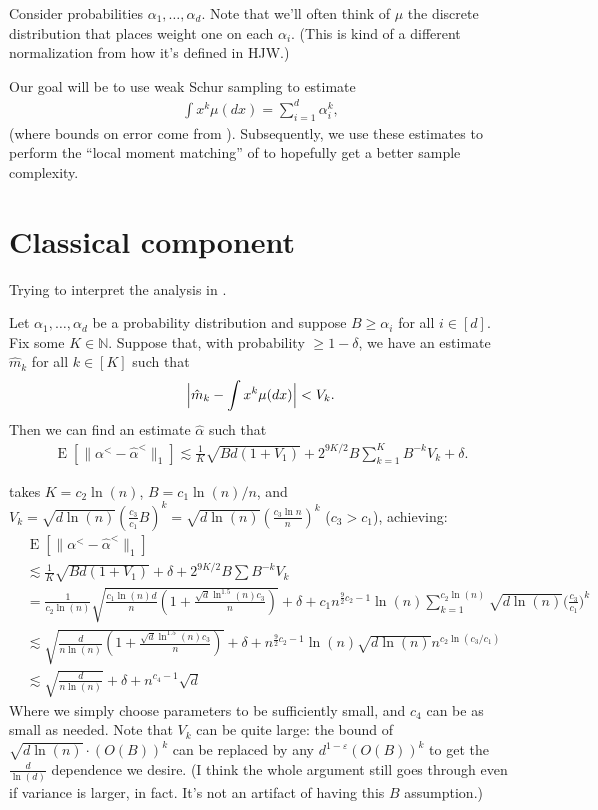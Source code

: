\documentclass{article}
\theoremstyle{definition}
\DeclareMathOperator{\E}{E}
\DeclarePairedDelimiter{\abs}{\lvert}{\rvert}
\newcommand{\eps}{\varepsilon}
\begin{document}
Consider probabilities $\alpha_1,\ldots,\alpha_d$.
Note that we'll often think of $\mu$ the discrete distribution that places weight one on each $\alpha_i$.
(This is kind of a different normalization from how it's defined in HJW.)

Our goal will be to use weak Schur sampling to estimate
\begin{align*}
    \int x^k \mu(dx) = \sum_{i=1}^d \alpha_i^k,
\end{align*}
(where bounds on error come from \cite{aisw19}).
Subsequently, we use these estimates to perform the ``local moment matching'' of \cite{hjw18} to hopefully get a better sample complexity.

\section{Classical component}

Trying to interpret the analysis in \cite{hjw18}.

\begin{theorem}
Let $\alpha_1, \dots, \alpha_d$ be a probability distribution and suppose $B \geq \alpha_i$ for all $i \in [d]$.
Fix some $K \in \mathbb{N}$.
Suppose that, with probability $\geq 1-\delta$, we have an estimate $\hat{m}_k$ for all $k \in [K]$ such that
\begin{align*}
    \abs[\Big]{\hat{m}_k - \int x^k \mu(dx)} < V_k.
\end{align*}
Then we can find an estimate $\hat{\alpha}$ such that
\begin{align*}
    \E[\|\alpha^< - \hat{\alpha}^<\|_1] \lesssim \frac1K\sqrt{Bd(1+V_1)} + 2^{9K/2}B\sum_{k=1}^K B^{-k}V_k + \delta.
\end{align*}
\end{theorem}

\cite{hjw18} takes $K = c_2 \ln (n)$, $B = c_1\ln(n)/n$, and $V_k = \sqrt{d\ln(n)}(\frac{c_3}{c_1}B)^k = \sqrt{d\ln(n)}(\frac{c_3\ln n}{n})^k$ ($c_3 > c_1$), achieving:
\begin{align*}
    &\E[\|\alpha^< - \hat{\alpha}^<\|_1] \\
    &\lesssim \frac1K\sqrt{Bd(1+V_1)} + \delta + 2^{9K/2}B\sum B^{-k}V_k \\
    &= \frac{1}{c_2\ln(n)}\sqrt{\frac{c_1\ln(n)d}{n}(1+\frac{\sqrt{d}\ln^{1.5}(n)c_3}{n})} + \delta + c_1n^{\frac{9}{2}c_2 - 1}\ln(n)\sum_{k=1}^{c_2\ln(n)} \sqrt{d\ln(n)}\Big(\frac{c_3}{c_1}\Big)^k \\
    &\lesssim \sqrt{\frac{d}{n\ln(n)}(1+\frac{\sqrt{d}\ln^{1.5}(n)c_3}{n})} + \delta + n^{\frac{9}{2}c_2 - 1}\ln(n)\sqrt{d\ln(n)}n^{c_2\ln(c_3/c_1)} \\
    &\lesssim \sqrt{\frac{d}{n\ln(n)}} + \delta + n^{c_4-1}\sqrt{d}
\end{align*}
Where we simply choose parameters to be sufficiently small, and $c_4$ can be as small as needed.
Note that $V_k$ can be quite large: the bound of $\sqrt{d\ln(n)}\cdot (O(B))^k$ can be replaced by any $d^{1-\eps}(O(B))^k$ to get the $\frac{d}{\ln(d)}$ dependence we desire.
(I think the whole argument still goes through even if variance is larger, in fact. It's not an artifact of having this $B$ assumption.)
\end{document}
